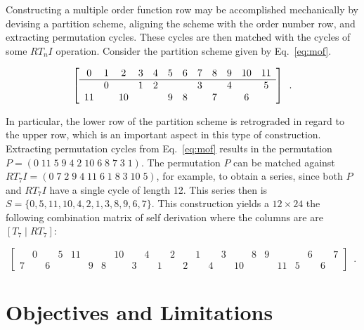 \begin{example}
	\cite[241, 247]{Morris1977}
	\label{ex:mof}
	Constructing a multiple order function row may be accomplished mechanically by devising a partition scheme, aligning the scheme with the order number row, and extracting permutation cycles. These cycles are then matched with the cycles of some $RT_nI$ operation. Consider the partition scheme given by Eq.~\ref{eq:mof}.

	\begin{equation}
		\label{eq:mof}
		\left[
        \begin{array}{cccccccccccc}
            0  & 1 & 2  & 3 & 4 & 5 & 6 & 7 & 8 & 9 & 10 & 11 \\
            \hline
               & 0 &    & 1 & 2 &   &   & 3 &   & 4 &    & 5  \\
            11 &   & 10 &   &   & 9 & 8 &   & 7 &   & 6  &
        \end{array}
        \right] \enspace.
	\end{equation}
	
	\noindent In particular, the lower row of the partition scheme is retrograded in regard to the upper row, which is an important aspect in this type of construction. Extracting permutation cycles from Eq.~\ref{eq:mof} results in the permutation $P = (0 \; 11 \; 5 \; 9 \; 4 \; 2 \; 10 \; 6 \; 8 \; 7 \; 3 \; 1)$. The permutation $P$ can be matched against $RT_7I = (0 \; 7 \; 2 \; 9 \; 4 \; 11 \; 6 \; 1 \; 8 \; 3 \; 10 \; 5)$, for example, to obtain a series, since both $P$ and $RT_7I$ have a single cycle of length 12. This series then is $S = \{0, 5, 11, 10, 4, 2, 1, 3, 8, 9, 6, 7\}$. This construction yields a $12 \times 24$ the following combination matrix of self derivation where the columns are are $[T_7 \; | \; RT_7]$:
	
	\begin{equation}
		\left[
        \begin{array}{cccccccccccc|cccccccccccc}
        & 0 && 5 & 11 &&& 10 && 4 && 2 && 1 && 3 && 8 & 9 &&& 6 && 7 \\
        7 && 6 &&& 9 & 8 && 3 && 1 && 2 && 4 && 10 &&& 11 & 5 && 6 &
        \end{array}
        \right] \enspace.
	\end{equation}
\end{example}

\section{Objectives and Limitations}

